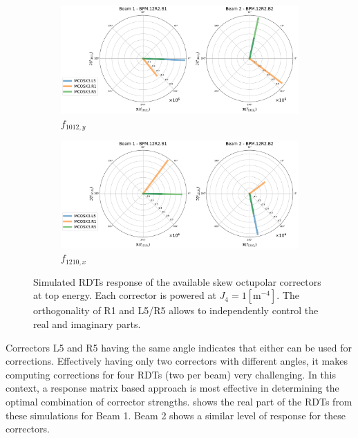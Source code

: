 \begin{figure}[!htb]
    \centering
    \begin{subfigure}{0.7\textwidth}
        \includegraphics[width=\textwidth]{./images/orthogonal_a4_inj_f1012_y.pdf}
        \caption{$f_{1012,y}$}
    \end{subfigure}
    \par\bigskip 
    \begin{subfigure}{0.7\textwidth}
        \includegraphics[width=\textwidth]{./images/orthogonal_a4_inj_f1210_x.pdf}
        \caption{$f_{1210,x}$}
    \end{subfigure}
    \caption{Simulated RDTs response of the available skew octupolar correctors at top energy.  Each
    corrector is powered at $J_4 = 1 [\text{m}^{-4}]$. The orthogonality of R1 and L5/R5 allows to
    independently control the real and imaginary parts.}
    \label{fig:skew_octupolar:response_correctors_polar}
\end{figure}

Correctors L5 and R5 having the same angle indicates that either can be used for corrections. Effectively
having only two correctors with different angles, it makes computing corrections for four RDTs (two
per beam) very challenging.  In this context, a response matrix based approach is most effective in
determining the optimal combination of corrector strengths.
 shows the real part of the RDTs from these
simulations for Beam 1. Beam 2 shows a similar level of response for these correctors.

